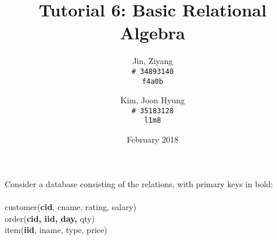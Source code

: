 \documentclass{article}
\title{Tutorial 6: Basic Relational Algebra}
\author{
	Jin, Ziyang\\
	\texttt{\# 34893140}\\
	\texttt{f4a0b}
	\and
	Kim, Joon Hyung\\
	\texttt{\# 35183128}\\
	\texttt{l1m8}
}
\date{February 2018}
\begin{document}
	\maketitle

\noindent Consider a database consisting of the relations, with primary keys in bold:\\
\\
customer(\textbf{cid}, cname, rating, salary)\\
order(\textbf{cid, iid, day,} qty)\\
item(\textbf{iid}, iname, type, price)

%
%
\end{document}
